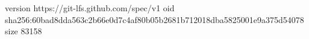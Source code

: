 version https://git-lfs.github.com/spec/v1
oid sha256:60bad8dda563c2b66e0d7c4af80b05b2681b712018dba5825001e9a375d54078
size 83158
